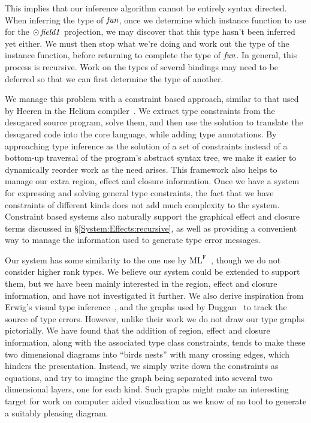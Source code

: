 This implies that our inference algorithm cannot be entirely syntax directed. When inferring the type of $\operatorname{\mathit{fun}}$, once we determine which instance function to use for the $\odot \operatorname{\mathit{field1}}$ projection, we may discover that this type hasn't been inferred yet either. We must then stop what we're doing and work out the type of the instance function, before returning to complete the type of $\operatorname{\mathit{fun}}$. In general, this process is recursive. Work on the types of several bindings may need to be deferred so that we can first determine the type of another. 

We manage this problem with a constraint based approach, similar to that used by Heeren in the Helium compiler~\cite{heeren:generalising-hm, heeren:constraint-type-inferencing, heeren:top-quality-error-messages}. We extract type constraints from the desugared source program, solve them, and then use the solution to translate the desugared code into the core language, while adding type annotations. By approaching type inference as the solution of a set of constraints instead of a bottom-up traversal of the program's abstract syntax tree, we make it easier to dynamically reorder work as the need arises. This framework also helps to manage our extra region, effect and closure information. Once we have a system for expressing and solving general type constraints, the fact that we have constraints of different kinds does not add much complexity to the system. Constraint based systems also naturally support the graphical effect and closure terms discussed in \S\ref{System:Effects:recursive}, as well as providing a convenient way to manage the information used to generate type error messages.

Our system has some similarity to the one use by $\textrm{ML}^\textrm{F}$~\cite{remy:graphic-type-constraints}, though we do not consider higher rank types. We believe our system could be extended to support them, but we have been mainly interested in the region, effect and closure information, and have not investigated it further. We also derive inspiration from Erwig's visual type inference~\cite{erwig:visual-type-inference}, and the graphs used by Duggan~\cite{duggan:explaining-type-inference} to track the source of type errors. However, unlike their work we do not draw our type graphs pictorially. We have found that the addition of region, effect and closure information, along with the associated type class constraints, tends to make these two dimensional diagrams into ``birds nests'' with many crossing edges, which hinders the presentation. Instead, we simply write down the constraints as equations, and try to imagine the graph being separated into several two dimensional layers, one for each kind. Such graphs might make an interesting target for work on computer aided visualisation as we know of no tool to generate a suitably pleasing diagram.


